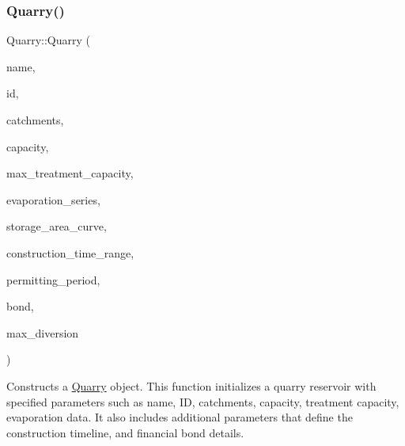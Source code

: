 \subsubsection{\texorpdfstring{Quarry()}{Quarry()}\hspace{0.1cm}{\footnotesize\ttfamily [2/5]}}
{\footnotesize\ttfamily Quarry\+::\+Quarry (\begin{DoxyParamCaption}\item[{const char $\ast$}]{name,  }\item[{const int}]{id,  }\item[{const vector$<$ \mbox{\hyperlink{classCatchment}{Catchment}} $\ast$$>$ \&}]{catchments,  }\item[{const double}]{capacity,  }\item[{const double}]{max\+\_\+treatment\+\_\+capacity,  }\item[{Evaporation\+Series \&}]{evaporation\+\_\+series,  }\item[{Data\+Series $\ast$}]{storage\+\_\+area\+\_\+curve,  }\item[{const vector$<$ double $>$ \&}]{construction\+\_\+time\+\_\+range,  }\item[{double}]{permitting\+\_\+period,  }\item[{\mbox{\hyperlink{classBond}{Bond}} \&}]{bond,  }\item[{double}]{max\+\_\+diversion }\end{DoxyParamCaption})}



Constructs a \mbox{\hyperlink{classQuarry}{Quarry}} object. This function initializes a quarry reservoir with specified parameters such as name, ID, catchments, capacity, treatment capacity, evaporation data. It also includes additional parameters that define the construction timeline, and financial bond details. 


